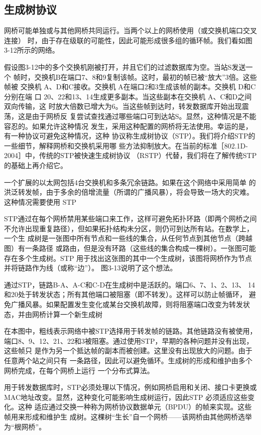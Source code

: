 \subsection{生成树协议}

网桥可能单独或与其他网桥共同运行。当两个以上的网桥使用（或交换机端口交叉连接）
时，由于存在级联的可能性，因此可能形成很多组的循环帧。我们看如图3-12所示的网络。

假设图3-12中的多个交换机刚被打开，并且它们的过滤数据库为空。当站S发送一个
帧时，交换机B在端口7、8和9复制该帧。这时，最初的帧已被“放大”3倍。这些帧被
交换机 A、D和C接收。交换机 A在端口2和3生成该帧的副本。交换机 D和C分别在端
口 20、22和13、14生成更多副本。当这些副本在交换机 A、C和D之间双向传输，这
时放大倍数已增大为6。当这些帧到达时，转发数据库开始出现震荡，这是由于网桥反
复尝试查找通过哪些端口可到达站S。显然，这种情况是不能容忍的。如果允许这种情况
发生，采用这种配置的网桥将无法使用。幸运的是，有一种协议可避免这种情况，这种
协议称生成树协议（STP）。我们将介绍STP的一些细节，解释网桥和交换机采用哪
些方法抑制放大。在当前的标准［802.1D-2004］中，传统的STP被快速生成树协议
（RSTP）代替，我们将在了解传统STP的基础上再介绍它。

一个扩展的以太网包括4台交换机和多条冗余链路。如果在这个网络中采用简单
的洪泛转发帧，由于多余的倍增流量（所谓的广播风暴），将会导致一场大的灾难。
这种情况需要使用 STP

STP通过在每个网桥禁用某些端口来工作，这样可避免拓扑环路（即两个网桥之间
不允许出现重复路径），但如果拓扑结构未分区，则仍可到达所有站。在数学上，一个生
成树是一张图中所有节点和一些线的集合，从任何节点到其他节点（跨越图）有一条路径
或路由，但是没有环路（这些线的集合构成一棵树）。一张图可能存在多个生成树。STP
用于找出这张图的其中一个生成树，该图将网桥作为节点并将链路作为线（或称“边”）。
图3-13说明了这个想法。

通过STP，链路B-A、A-C和C-D在生成树中是活跃的。端口6、7、1、2、13、
14和20处于转发状态；所有其他端口被阻塞（即不转发）。这样可以防止帧循环，
避免广播风暴。如果配置发生变化或某台交换机故障，则将阻塞端口改变为转发状
态，并由网桥计算一个新生成树

在本图中，粗线表示网络中被STP选择用于转发帧的链路。其他链路没有被使用，
端口8、9、12、21、22和3被阻塞。通过使用STP，早期的各种问题并没有出现，这些帧只
是作为另一个抵达帧的副本而被创建。这里没有出现放大的问题。由于任意两个站之间只有
一条路径，因此可以避免循环。生成树的形成和维护由多个网桥完成，在每个网桥上运行
一个分布式算法。

用于转发数据库时，STP必须处理以下情况，例如网桥启用和关闭、接口卡更换或
MAC地址改变。显然，这种变化可能影响生成树运行，因此STP 必须适应这些变化。这种
适应通过交换一种称为网桥协议数据单元（BPDU）的帧来实现。这些帧用来形成和维护生
成树。这棵树“生长”自一个网桥——该网桥由其他网桥选举为“根网桥”。

